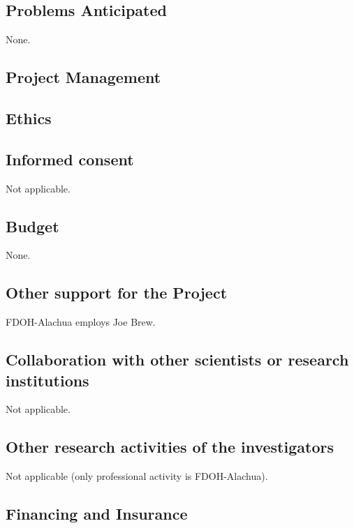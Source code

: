\documentclass{article}
\begin{document}
\begin{multicols}{2}
\blindtext

\subsection*{Problems Anticipated}

None.

\subsection*{Project Management}

\blindtext 

\subsection*{Ethics}

\blindtext 

\subsection*{Informed consent}
Not applicable.

\subsection*{Budget}

None.

\subsection*{Other support for the Project}

FDOH-Alachua employs Joe Brew.

\subsection*{Collaboration with other scientists or research institutions}

Not applicable.

\subsection*{Other research activities of the investigators}

Not applicable (only professional activity is FDOH-Alachua).

\subsection*{Financing and Insurance}


\end{multicols}
\end{document}
